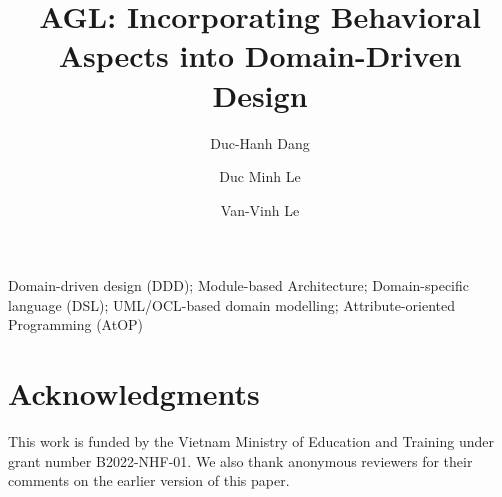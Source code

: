 \documentclass[preprint,3p]{elsarticle}
\begin{document}
\begin{frontmatter}

%

\title{AGL: Incorporating Behavioral Aspects into Domain-Driven Design}


\author[addressUET,addressVNU]{Duc-Hanh Dang}
\address[addressUET]{Department of Software Engineering, VNU University of Engineering and Technology, Vietnam}
\address[addressVNU]{Vietnam National University, Hanoi}

\author[addressFE]{Duc Minh Le}
\address[addressFE]{Department of Information Technology, Swinburne Vietnam, FPT Univeristy}

\author[addressUET,addressVNU,addressVUTED]{Van-Vinh Le}
\address[addressVUTED]{Department of Information Technology, Vinh University of Technology Education, Vietnam}
%


\begin{keyword}
Domain-driven design (DDD);  
Module-based Architecture;
Domain-specific language (DSL);
UML/OCL-based domain modelling; 
Attribute-oriented Programming (AtOP)
\end{keyword}

\end{frontmatter}
%

%

%

%

%

%

%

%

%

%


\section*{Acknowledgments}
This work is funded by the Vietnam Ministry of Education and Training under grant number B2022-NHF-01. We also thank anonymous reviewers for their
comments on the earlier version of this paper.

\end{document}
